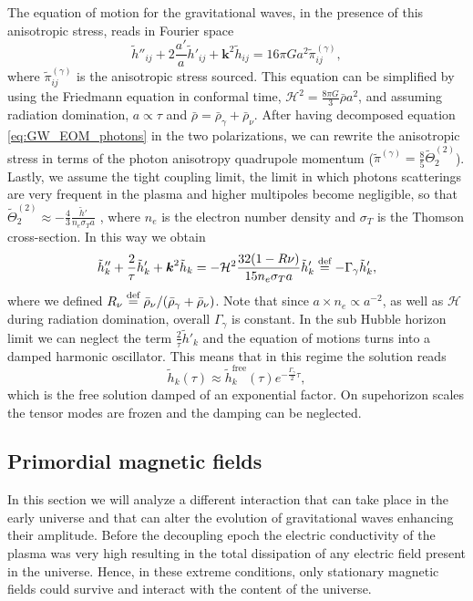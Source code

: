 The equation of motion for the gravitational waves, in the presence of this anisotropic stress, reads in Fourier space
\begin{equation}
    \tilde h''_{ij}+2\frac{a'}{a}\tilde h'_{ij}+\boldsymbol{k}^2 \tilde h_{ij}=16\pi G a^2\tilde\pi^{(\gamma)}_{ij},\label{eq:GW_EOM_photons}
\end{equation}
where $\tilde\pi^{(\gamma)}_{ij}$ is the anisotropic stress sourced. This equation can be simplified by using the Friedmann equation in conformal time, $\mathcal{H}^2=\tfrac{8\pi G}{3}\bar\rho a^2$, and assuming radiation domination, $a\propto \tau$ and $\bar\rho=\bar\rho_\gamma+\bar\rho_\nu$. After having decomposed equation \eqref{eq:GW_EOM_photons} in the two polarizations, we can rewrite the anisotropic stress in terms of the photon anisotropy quadrupole momentum ($\tilde\pi^{(\gamma)}=\tfrac85\tilde\Theta^{(2)}_2$). Lastly, we assume the tight coupling limit, the limit in which photons scatterings are very frequent in the plasma and higher multipoles become negligible, so that $\tilde\Theta^{(2)}_2\approx-\tfrac43\tfrac{\tilde h'}{n_e\sigma_T a}$ \cite{HuWhite},
where $n_e$ is the electron number density and $\sigma_T$ is the Thomson cross-section. In this way we obtain 
$$
    \tilde h''_{k}+\frac{2}{\tau}\tilde h'_{k}+\boldsymbol{k}^2 \tilde h_{k}=-\mathcal{H}^2\frac{32(1-R\nu)}{15n_e\sigma_T a}\tilde h'_{k}\stackrel{\text{def}}{=} -\Gamma_\gamma \tilde h'_k,
$$
where we defined $R_\nu\stackrel{\text{def}}{=}\bar\rho_\nu/(\bar\rho_\gamma+\bar\rho_\nu)$. Note that since $a\times n_e\propto a^{-2}$, as well as $\mathcal{H}$ during radiation domination, overall $\Gamma_\gamma$ is constant. In the sub Hubble horizon limit we can neglect the term $\tfrac2\tau \tilde h'_k$ and the equation of motions turns into a damped harmonic oscillator. This means that in this regime the solution reads 
\begin{equation}
    \tilde h_k(\tau)\approx\tilde h_k^{\text{free}}(\tau)e^{-\frac{\Gamma_\gamma}{2}\tau},
\end{equation} 
which is the free solution damped of an exponential factor. On supehorizon scales the tensor modes are frozen and the damping can be neglected.
\subsection{Primordial magnetic fields}
In this section we will analyze a different interaction that can take place in the early universe and that can alter the evolution of gravitational waves enhancing their amplitude. Before the decoupling epoch the electric conductivity of the plasma was very high resulting in the total dissipation of any electric field present in the universe. Hence, in these extreme conditions, only stationary magnetic fields could survive and interact with the content of the universe. 

